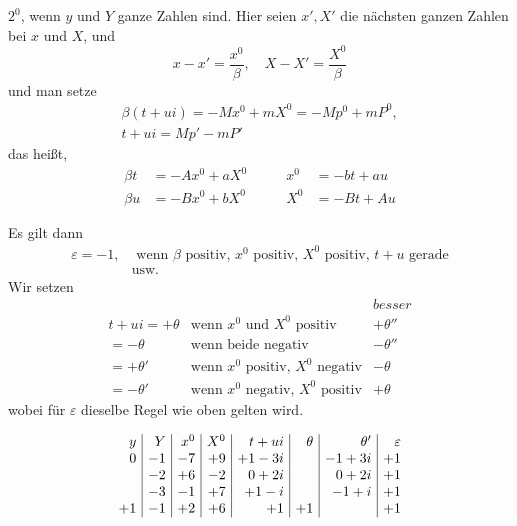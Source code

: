 $2^0$, wenn $y$ und $Y$ ganze Zahlen sind. Hier seien $x',X'$ die nächsten ganzen Zahlen bei $x$ und $X$, und
\[
x-x'=\frac{x^0}{\beta},\quad X-X'=\frac{X^0}{\beta}
\]
und man setze
\[
\begin{gathered}
\beta(t+ui)=-Mx^0+mX^0=-Mp^0+mP^0,\\
t+ui=Mp'-mP'
\end{gathered}
\]
das heißt,
\[
\begin{alignedat}{2}
\beta t&=-Ax^0+aX^0\qquad&x^0&=-bt+au\\
\beta u&=-Bx^0+bX^0&X^0&=-Bt+Au
\end{alignedat}
\]

Es gilt dann
\[
\begin{aligned}
\varepsilon=-1,&\text{ wenn }\beta\text{ positiv, }x^0\text{ positiv, }X^0\text{ positiv, }t+u\text{ gerade}\\
&\text{usw.}
\end{aligned}
\]
Wir setzen
\[
\begin{array}{rll}
&&\textit{besser}\\
t+ui=+\theta&\text{wenn }x^0\text{ und }X^0\text{ positiv}&+\theta''\\
=-\theta&\text{wenn beide negativ}&-\theta''\\
=+\theta'&\text{wenn }x^0\text{ positiv, }X^0\text{ negativ}&-\theta\\
=-\theta'&\text{wenn }x^0\text{ negativ, }X^0\text{ positiv}&+\theta
\end{array}
\]
wobei für $\varepsilon$ dieselbe Regel wie oben gelten wird.

\[
\setlength{\arraycolsep}{4pt}
\begin{array}{r|r|r|r|r|r|r|r}
y&Y&x^0&X^0&t+ui&\theta&\theta'&\varepsilon\\
0&-1&-7&+9&+1-3i&&-1+3i&+1\\
&-2&+6&-2&0+2i&&0+2i&+1\\
&-3&-1&+7&+1-i&&-1+i&+1\\
+1&-1&+2&+6&+1&+1&&+1
\end{array}
\]

